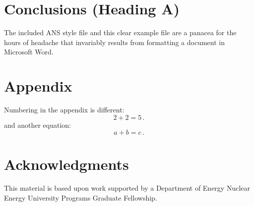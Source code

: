 \documentclass{anstrans}
\begin{document}
\section{Conclusions (Heading A)}

The included ANS style file and this clear example file are a panacea for
the hours of headache that invariably results from formatting a document in
Microsoft Word.

\appendix
\section{Appendix}

Numbering in the appendix is different:
\begin{equation} \label{eq:appendix}
  2 + 2 = 5\,.
\end{equation}
and another equation:
\begin{equation} \label{eq:appendix2}
  a + b = c\,.
\end{equation}

\section{Acknowledgments}
This material is based upon work supported by a Department of Energy Nuclear
Energy University Programs Graduate Fellowship.



\end{document}
